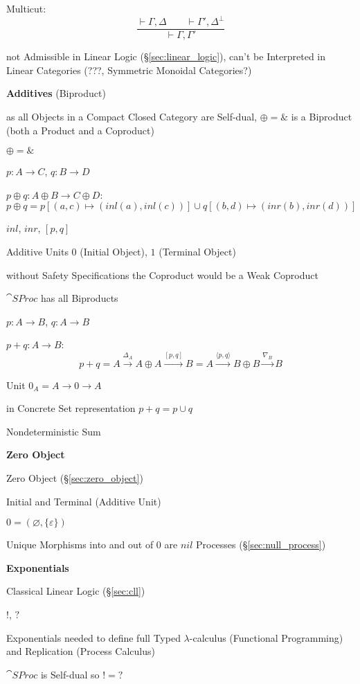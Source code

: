 Multicut:
\[
  \frac{\vdash\Gamma,\Delta \quad\quad \vdash\Gamma',\Delta^\bot}
  {\vdash\Gamma,\Gamma'}
\]

not Admissible in Linear Logic (\S\ref{sec:linear_logic}), can't be
Interpreted in Linear Categories (???, Symmetric Monoidal Categories?)


\textbf{Additives} (Biproduct)

as all Objects in a Compact Closed Category are Self-dual, $\oplus =
\&$ is a Biproduct (both a Product and a Coproduct)

$\oplus = \&$

$p : A \rightarrow C$, $q : B \rightarrow D$

$p \oplus q : A \oplus B \rightarrow C \oplus D$:
\[
  p \oplus q = p[(a,c) \mapsto (inl(a),inl(c))]
    \cup q[(b,d) \mapsto (inr(b),inr(d))]
\]

$inl$, $inr$, $[p,q]$ %

Additive Units $0$ (Initial Object), $1$ (Terminal Object)

without Safety Specifications the Coproduct would be a Weak Coproduct

$\cat{SProc}$ has all Biproducts

$p : A \rightarrow B$, $q : A \rightarrow B$

$p + q : A \rightarrow B$:
\[
  p + q = A \xrightarrow{\Delta_A} A \oplus A \xrightarrow{[p,q]} B
        = A \xrightarrow{\langle p,q \rangle} B
          \oplus B \xrightarrow{\nabla_B} B
\]

Unit $0_A = A \rightarrow 0 \rightarrow A$

in Concrete Set representation $p + q = p \cup q$

Nondeterministic Sum


\textbf{Zero Object}

Zero Object (\S\ref{sec:zero_object})

Initial and Terminal (Additive Unit)

$0 = (\varnothing, \{\varepsilon\})$

Unique Morphisms into and out of $0$ are $nil$ Processes
(\S\ref{sec:null_process})


\textbf{Exponentials}

Classical Linear Logic (\S\ref{sec:cll})

$!$, $?$

Exponentials needed to define full Typed $\lambda$-calculus
(Functional Programming) and Replication (Process Calculus)

$\cat{SProc}$ is Self-dual so $! = ?$


